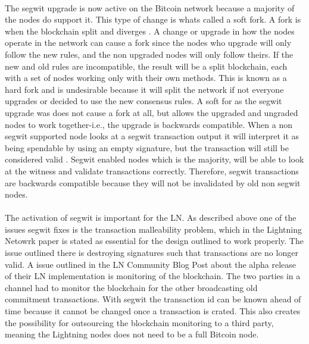 \documentclass[informationsecurity]{gucmasterproject}
\begin{document}
\paragraph{}
The segwit upgrade is now active on the Bitcoin network because a majority of the nodes do support it. This type of change is whats called a soft fork. A fork is when the blockchain split and diverges \cite{antonopoulos2017mastering}. A change or upgrade in how the nodes operate in the network can cause a fork since the nodes who upgrade will only follow the new rules, and the non upgraded nodes will only follow theirs. If the new and old rules are incompatible, the result will be a split blockchain, each with a set of nodes working only with their own methods. This is known as a hard fork and is undesirable because it will split the network if not everyone upgrades or decided to use the new consensus rules. A soft for as the segwit upgrade was does not cause a fork at all, but allows the upgraded and ungraded nodes to work together-i.e., the upgrade is backwards compatible. When a non segwit supported node looks at a segwit transaction output it will interpret it as being spendable by using an empty signature, but the transaction will still be considered valid \cite{antonopoulos2017mastering}. Segwit enabled nodes which is the majority, will be able to look at the witness and validate transactions correctly. Therefore, segwit transactions are backwards compatible because they will not be invalidated by old non segwit nodes.

\paragraph{}
The activation of segwit is important for the LN. As described above one of the issues segwit fixes is the transaction malleability problem, which in the Lightning Netowrk paper \cite{poon2015bitcoin} is stated as essential for the design outlined to work properly. The issue outlined there is destroying signatures such that transactions are no longer valid. A issue outlined in the LN Community Blog Post\cite{LN_segwit} about the alpha release of their LN implementation is monitoring of the blockchain. The two parties in a channel had to monitor the blockchain for the other broadcasting old commitment transactions. With segwit the transaction id can be known ahead of time because it cannot be changed once a transaction is crated. This also creates the possibility for outsourcing the blockchain monitoring to a third party, meaning the Lightning nodes does not need to be a full Bitcoin node.
\end{document}
